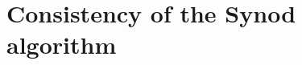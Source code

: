 \documentclass[journal]{IEEEtran}
\begin{document}
%







\vfill

\pagebreak

\appendices
\section{Consistency of the Synod algorithm}
\label{synod-safety}
\end{document}
